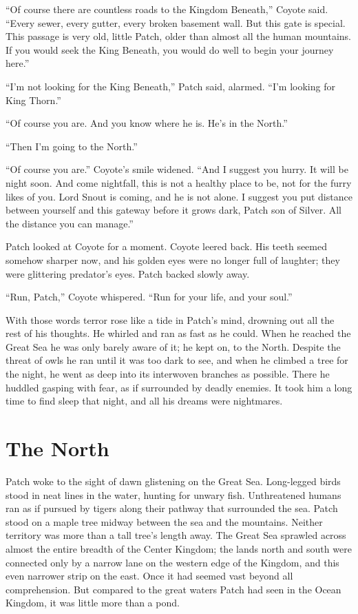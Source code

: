 \documentclass[ebook,oneside,openany,17pt]{memoir}
\renewcommand{\thechapter}{\Roman{chapter}}
\newcounter{sections}
\newcommand{\sections}[1]{%
  \section*{#1}
  \addtocounter{sections}{1}%
  \pdfbookmark[1]{#1}{section.\thechapter.\thesections}}
\begin{document}
“Of course there are countless roads to the Kingdom Beneath,” Coyote
said. “Every sewer, every gutter, every broken basement wall. But this
gate is special. This passage is very old, little Patch, older than
almost all the human mountains. If you would seek the King Beneath,
you would do well to begin your journey here.”

“I’m not looking for the King Beneath,” Patch said, alarmed. “I’m
looking for King Thorn.”

“Of course you are. And you know where he is. He’s in the North.”

“Then I’m going to the North.”

“Of course you are.” Coyote’s smile widened. “And I suggest you
hurry. It will be night soon. And come nightfall, this is not a
healthy place to be, not for the furry likes of you. Lord Snout is
coming, and he is not alone. I suggest you put distance between
yourself and this gateway before it grows dark, Patch son of
Silver. All the distance you can manage.”

Patch looked at Coyote for a moment. Coyote leered back. His teeth
seemed somehow sharper now, and his golden eyes were no longer full of
laughter; they were glittering predator’s eyes. Patch backed slowly
away.

“Run, Patch,” Coyote whispered. “Run for your life, and your soul.”

With those words terror rose like a tide in Patch’s mind, drowning out
all the rest of his thoughts. He whirled and ran as fast as he
could. When he reached the Great Sea he was only barely aware of it;
he kept on, to the North. Despite the threat of owls he ran until it
was too dark to see, and when he climbed a tree for the night, he went
as deep into its interwoven branches as possible. There he huddled
gasping with fear, as if surrounded by deadly enemies. It took him a
long time to find sleep that night, and all his dreams were
nightmares.


\sections{The North}

Patch woke to the sight of dawn glistening on the Great
Sea. Long-legged birds stood in neat lines in the water, hunting for
unwary fish. Unthreatened humans ran as if pursued by tigers along
their pathway that surrounded the sea. Patch stood on a maple tree
midway between the sea and the mountains. Neither territory was more
than a tall tree’s length away. The Great Sea sprawled across almost
the entire breadth of the Center Kingdom; the lands north and south
were connected only by a narrow lane on the western edge of the
Kingdom, and this even narrower strip on the east. Once it had seemed
vast beyond all comprehension. But compared to the great waters Patch
had seen in the Ocean Kingdom, it was little more than a pond.
\end{document}
